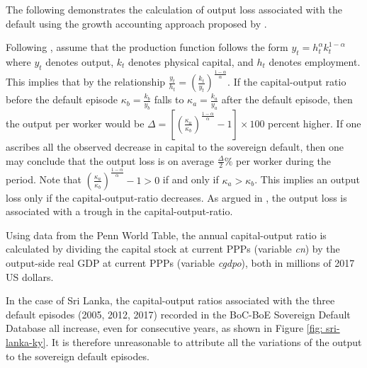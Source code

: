 The following demonstrates the calculation of output loss associated with the default using the growth accounting approach proposed by \citet{zarazaga-12}.

Following \citet{zarazaga-12}, assume that the production function follows the form $y_t = h^\alpha_t k^{1-\alpha}_t$ where $y_t$ denotes output, $k_t$ denotes physical capital, and $h_t$ denotes employment.
This implies that by the relationship $\frac{y_t}{h_t} = \left( \frac{k_t}{y_t} \right)^{\frac{1-\alpha}{\alpha}}$. If the capital-output ratio before the default episode $\kappa_b =\frac{k_b}{y_b}$ falls to $\kappa_a = \frac{k_{a}}{y_a}$ after the default episode, then the output per worker would be
$\Delta = \left[\left(\frac{\kappa_a}{\kappa_b} \right)^{\frac{1-\alpha}{\alpha}} -1\right]\times 100$ percent higher.
If one ascribes all the observed decrease in capital to the sovereign default, then one may conclude that the output loss is on average $\frac{\Delta}{2} \%$ per worker during the period.
Note that $\left(\frac{\kappa_a}{\kappa_b} \right)^{\frac{1-\alpha}{\alpha}} -1 > 0$ if and only if $\kappa_a > \kappa_b$. This implies an output loss only if the capital-output-ratio decreases. As argued in \citet{zarazaga-12}, the output loss is associated with a trough in the capital-output-ratio.

Using data from the Penn World Table, the annual capital-output ratio is calculated by dividing the capital stock at current PPPs (variable \emph{cn}) by the output-side real GDP at current PPPs (variable \emph{cgdpo}), both in millions of 2017 US dollars.

In the case of Sri Lanka, the capital-output ratios associated with the three default episodes (2005, 2012, 2017) recorded in the BoC-BoE Sovereign Default Database all increase, even for consecutive years, as shown in Figure \ref{fig: sri-lanka-ky}. It is therefore unreasonable to attribute all the variations of the output to the sovereign default episodes.

